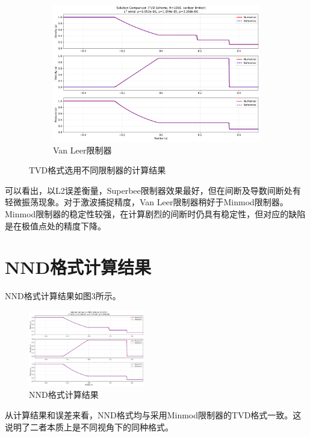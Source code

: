 \documentclass[12pt, a4paper]{article}
\begin{document}
\begin{figure}[htbp]
    \vspace{0.5cm}
    \centering
    \begin{subfigure}[b]{0.45\textwidth} 
        \centering
        \includegraphics[width=\textwidth]{./pictures/Solution Comparison (TVD Scheme, N=1001, vanleer limiter).png} 
        \caption{Van Leer限制器}
    \end{subfigure}
    \caption{TVD格式选用不同限制器的计算结果}
\end{figure}

可以看出，以L2误差衡量，Superbee限制器效果最好，但在间断及导数间断处有轻微振荡现象。对于激波捕捉精度，Van Leer限制器稍好于Minmod限制器。Minmod限制器的稳定性较强，在计算剧烈的间断时仍具有稳定性，但对应的缺陷是在极值点处的精度下降。

\section{NND格式计算结果}
NND格式计算结果如图3所示。
\begin{figure}[htbp]
    \centering
    \includegraphics[width=0.45\textwidth]{./pictures/Solution Comparison (NND Scheme, N=1001).png}
    \caption{NND格式计算结果}
\end{figure}

从计算结果和误差来看，NND格式均与采用Minmod限制器的TVD格式一致。这说明了二者本质上是不同视角下的同种格式。
\end{document}
